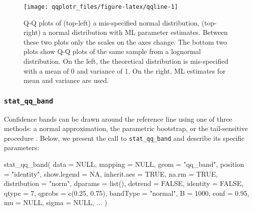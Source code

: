 \begin{Schunk}
\begin{figure}
\texttt{[image: qqplotr\_files/figure-latex/qqline-1]} \caption{Q-Q plots of (top-left) a mis-specified normal distribution, (top-right) a normal distribution with ML parameter estimates. Between these two plots only the scales on the axes change. The bottom two plots show Q-Q plots of the same sample from a lognormal distribution. On the left, the theoretical distribution is mis-specified with a mean of 0 and variance of 1. On the right, ML estimates for mean and variance are used. }\label{fig:qqline}
\end{figure}
\end{Schunk}

\subsubsection{\texorpdfstring{\texttt{stat\_qq\_band}}{stat\_qq\_band}}\label{stat_qq_band}

Confidence bands can be drawn around the reference line using one of
three methods: a normal approximation, the parametric bootstrap, or the
tail-sensitive procedure \citep{Aldor-Noiman2013-xw}. Below, we present
the call to \texttt{stat\_qq\_band} and describe its specific
parameters:

\begin{Schunk}
\begin{Sinput}
stat_qq_band(
  data = NULL,
  mapping = NULL,
  geom = "qq_band",
  position = "identity",
  show.legend = NA,
  inherit.aes = TRUE,
  na.rm = TRUE,
  distribution = "norm",
  dparams = list(),
  detrend = FALSE,
  identity = FALSE,
  qtype = 7,
  qprobs = c(0.25, 0.75),
  bandType = "normal",
  B = 1000,
  conf = 0.95,
  mu = NULL,
  sigma = NULL,
  ...
  )
\end{Sinput}
\end{Schunk}

